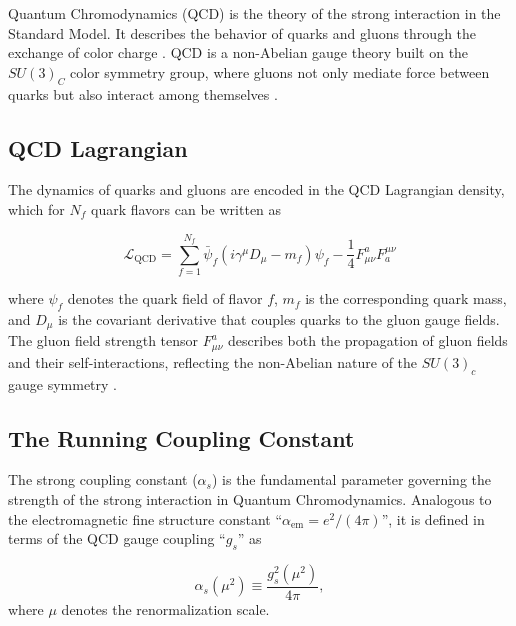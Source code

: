 Quantum Chromodynamics (QCD) is the theory of the strong interaction in the Standard Model. It describes the behavior of quarks and gluons through the exchange of color charge \cite{peskin_QFT, griffiths_book}. \ac{QCD} is a non-Abelian gauge theory built on the \(SU(3)_C\) color symmetry group, where gluons not only mediate force between quarks but also interact among themselves \cite{peskin_QFT}.

\subsection{QCD Lagrangian}

The dynamics of quarks and gluons are encoded in the \ac{QCD} Lagrangian density, which for \(N_f\) quark flavors can be written as \cite{lancaster2014qft, ellis1996qcd, peskin_QFT}

\begin{equation}
\mathcal{L}_{\text{QCD}} = \sum_{f=1}^{N_f} \bar{\psi}_f \left( i \gamma^\mu D_\mu - m_f \right) \psi_f - \frac{1}{4} F_{\mu\nu}^a F^{\mu\nu}_a
\label{eq:QCD_lagrangian}
\end{equation}

where \(\psi_f\) denotes the quark field of flavor \(f\), \(m_f\) is the corresponding quark mass, and \(D_\mu\) is the covariant derivative that couples quarks to the gluon gauge fields. The gluon field strength tensor \(F_{\mu\nu}^a\) describes both the propagation of gluon fields and their self-interactions, reflecting the non-Abelian nature of the \(SU(3)_c\) gauge symmetry \cite{lancaster2014qft, ellis1996qcd, peskin_QFT}.




\subsection{The Running Coupling Constant}

The strong coupling constant ($\alpha_s$) is the fundamental parameter governing the strength of the strong interaction in Quantum Chromodynamics. Analogous to the electromagnetic fine structure constant ``$\alpha_{\mathrm{em}} = e^2/(4\pi)$'', it is defined in terms of the \ac{QCD} gauge coupling ``$g_s$'' as \cite{deur2016qcd}

\begin{equation}
\alpha_s(\mu^2) \equiv \frac{g_s^2(\mu^2)}{4\pi},
\label{eq:coupling_const_QCD}
\end{equation}
where $\mu$ denotes the renormalization scale.


